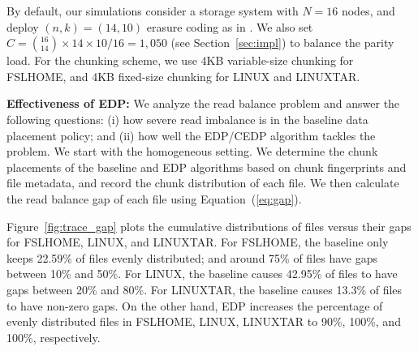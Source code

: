 
By default, our simulations consider a storage system with $N=16$ nodes, and
deploy $(n,k)=(14,10)$ erasure coding as in \cite{Sathiamoorthy13}.  We also
set $C = {16 \choose 14} \times 14\times 10 / 16 = 1,050$ (see
Section~\ref{sec:impl}) to balance the parity load.  For the chunking scheme,
we use 4KB variable-size chunking for FSLHOME, and 4KB fixed-size chunking for
LINUX and LINUXTAR.

\textbf{Effectiveness of EDP:} We analyze the read balance problem and answer
the following questions: (i) how severe read imbalance is in the baseline data
placement policy; and (ii) how well the EDP/CEDP algorithm tackles the
problem.  We start with the homogeneous setting.  We determine the chunk 
placements of the baseline and EDP algorithms based on chunk fingerprints 
and file metadata, and record the chunk distribution of each file.  We then 
calculate the read balance gap of each file using Equation~(\ref{eq:gap}).  

Figure~\ref{fig:trace_gap} plots the cumulative distributions of files versus
their gaps for FSLHOME, LINUX, and LINUXTAR.  For FSLHOME, the baseline only
keeps 22.59\% of files evenly distributed; and around 75\% of files have gaps
between 10\% and 50\%.  For LINUX, the baseline causes 42.95\% of files to
have gaps between 20\% and 80\%.  For LINUXTAR, the baseline causes 13.3\% of
files to have non-zero gaps.  On the other hand, EDP increases the percentage
of evenly distributed files in FSLHOME, LINUX, LINUXTAR to 90\%, 100\%, and
100\%, respectively. 


